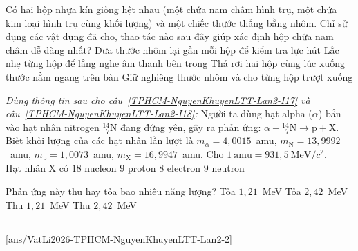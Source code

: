 	\begin{ex}%
		Có hai hộp nhựa kín giống hệt nhau (một chứa nam châm hình trụ, một chứa kim loại hình trụ cùng khối lượng) và một chiếc thước thẳng bằng nhôm. Chỉ sử dụng các vật dụng đã cho, thao tác nào sau đây giúp xác định hộp chứa nam châm dễ dàng nhất?
		\choice
		{Đưa thước nhôm lại gần mỗi hộp để kiểm tra lực hút}
		{Lắc nhẹ từng hộp để lắng nghe âm thanh bên trong}
		{Thả rơi hai hộp cùng lúc xuống thước nằm ngang trên bàn}
		{\True Giữ nghiêng thước nhôm và cho từng hộp trượt xuống}
	\end{ex}

	\begin{ex}%
		\label{TPHCM-NguyenKhuyenLTT-Lan2-I17}
		\textit{Dùng thông tin sau cho câu~\ref{TPHCM-NguyenKhuyenLTT-Lan2-I17} và câu~\ref{TPHCM-NguyenKhuyenLTT-Lan2-I18}:} Người ta dùng hạt alpha ($\alpha$) bắn vào hạt nhân nitrogen ${}^{14}_{\phantom{1}7}\text{N}$ đang đứng yên, gây ra phản ứng: $\alpha+{}^{14}_{\phantom{1}7}\text{N}\to\text{p}+\text{X}$. Biết khối lượng của các hạt nhân lần lượt là $m_\alpha=4{,}0015$~amu, $m_\text{N}=13{,}9992$~amu, $m_\text{p}=1{,}0073$~amu, $m_\text{X}=16{,}9947$~amu. Cho $1~\text{amu}=931{,}5~\text{MeV}/c^2$.\\
		Hạt nhân X có
		\choice
		{$18$ nucleon}
		{$9$ proton}
		{$8$ electron}
		{\True $9$ neutron}
	\end{ex}

	\begin{ex}%
		\label{TPHCM-NguyenKhuyenLTT-Lan2-I18}
		Phản ứng này thu hay tỏa bao nhiêu năng lượng?
		\choice
		{Tỏa $1{,}21$~MeV}
		{Tỏa $2{,}42$~MeV}
		{\True Thu $1{,}21$~MeV}
		{Thu $2{,}42$~MeV}
	\end{ex}

	\subsection*{}
	\setcounter{ex}{0}
	[ans/VatLi2026-TPHCM-NguyenKhuyenLTT-Lan2-2]

